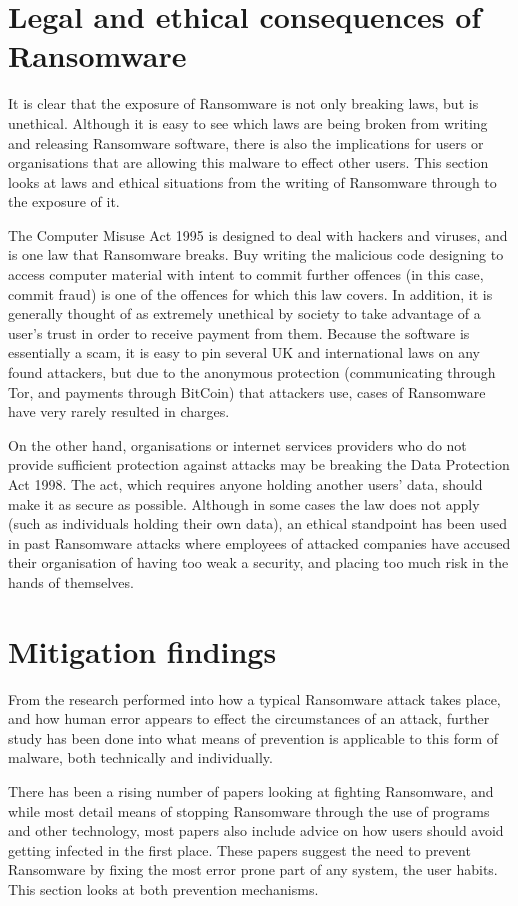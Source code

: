 \documentclass[journal,comsoc]{IEEEtran}
\begin{document}
\section{Legal and ethical consequences of Ransomware}
It is clear that the exposure of Ransomware is not only breaking laws, but is unethical. Although it is easy to see which laws are being broken from writing and releasing Ransomware software, there is also the implications for users or organisations that are allowing this malware to effect other users. This section looks at laws and ethical situations from the writing of Ransomware through to the exposure of it. \par
The Computer Misuse Act 1995 is designed to deal with hackers and viruses, and is one law that Ransomware breaks. Buy writing the malicious code designing to access computer material with intent to commit further offences (in this case, commit fraud) is one of the offences for which this law covers. In addition, it is generally thought of as extremely unethical by society to take advantage of a user's trust in order to receive payment from them. Because the software is essentially a scam, it is easy to pin several UK and international laws on any found attackers, but due to the anonymous protection (communicating through Tor, and payments through BitCoin) that attackers use, cases of Ransomware have very rarely resulted in charges. \par
On the other hand, organisations or internet services providers who do not provide sufficient protection against attacks may be breaking the Data Protection Act 1998. The act, which requires anyone holding another users' data, should make it as secure as possible. Although in some cases the law does not apply (such as individuals holding their own data), an ethical standpoint has been used in past Ransomware attacks where employees of attacked companies have accused their organisation of having too weak a security, and placing too much risk in the hands of themselves.

\section{Mitigation findings}
From the research performed into how a typical Ransomware attack takes place, and how human error appears to effect the circumstances of an attack, further study has been done into what means of prevention is applicable to this form of malware, both technically and individually. \par
There has been a rising number of papers looking at fighting Ransomware, and while most detail means of stopping Ransomware through the use of programs and other technology, most papers also include advice on how users should avoid getting infected in the first place. These papers suggest the need to prevent Ransomware by fixing the most error prone part of any system, the user habits. This section looks at both prevention mechanisms.
\end{document}
